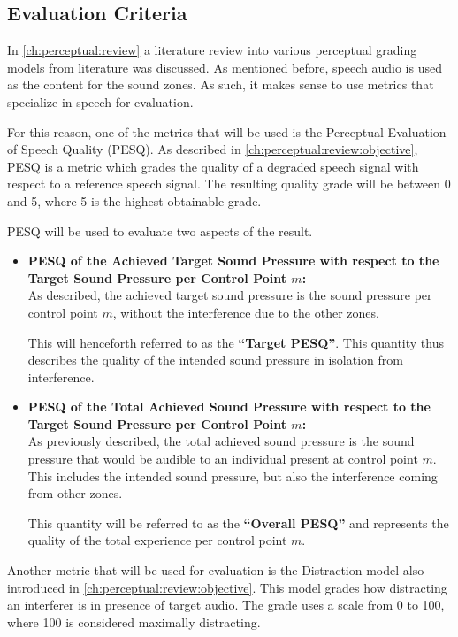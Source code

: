 \subsection{Evaluation Criteria}
In \autoref{ch:perceptual:review} a literature review into various perceptual grading models from literature was discussed.
As mentioned before, speech audio is used as the content for the sound zones.
As such, it makes sense to use metrics that specialize in speech for evaluation.

For this reason, one of the metrics that will be used is the Perceptual Evaluation of Speech Quality (PESQ).
As described in \autoref{ch:perceptual:review:objective}, PESQ is a metric which grades the quality of a degraded speech signal with respect to a reference speech signal.
The resulting quality grade will be between 0 and 5, where 5 is the highest obtainable grade.

PESQ will be used to evaluate two aspects of the result.
\begin{itemize}
    \item \textbf{PESQ of the Achieved Target Sound Pressure with respect to the Target Sound Pressure per Control Point $m$:}\\
        As described, the achieved target sound pressure is the sound pressure per control point $m$, without the interference due to the other zones. 

        This will henceforth referred to as the \textbf{``Target PESQ''}.
        This quantity thus describes the quality of the intended sound pressure in isolation from interference.
    \item \textbf{PESQ of the Total Achieved Sound Pressure with respect to the Target Sound Pressure per Control Point $m$:}\\
        As previously described, the total achieved sound pressure is the sound pressure that would be audible to an individual present at control point $m$.  
        This includes the intended sound pressure, but also the interference coming from other zones.

        This quantity will be referred to as the \textbf{``Overall PESQ''} and represents the quality of the total experience per control point $m$. 
\end{itemize}

Another metric that will be used for evaluation is the Distraction model also introduced in \autoref{ch:perceptual:review:objective}.
This model grades how distracting an interferer is in presence of target audio.
The grade uses a scale from 0 to 100, where 100 is considered maximally distracting.

